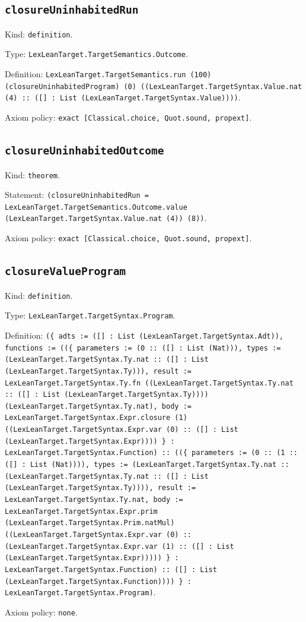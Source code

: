 \documentclass[11pt]{article}
\begin{document}
\subsection*{\texttt{closureUninhabitedRun}}
\noindent Kind: \texttt{definition}.\par
\noindent Type: \texttt{LexLeanTarget.TargetSemantics.Outcome}.\par
\noindent Definition: \texttt{LexLeanTarget.TargetSemantics.run (100) (closureUninhabitedProgram) (0) ((LexLeanTarget.TargetSyntax.Value.nat (4) :: ([] : List (LexLeanTarget.TargetSyntax.Value))))}.\par
\noindent Axiom policy: \texttt{exact [Classical.choice, Quot.sound, propext]}.\par
\subsection*{\texttt{closureUninhabitedOutcome}}
\noindent Kind: \texttt{theorem}.\par
\noindent Statement: \texttt{(closureUninhabitedRun = LexLeanTarget.TargetSemantics.Outcome.value (LexLeanTarget.TargetSyntax.Value.nat (4)) (8))}.\par
\noindent Axiom policy: \texttt{exact [Classical.choice, Quot.sound, propext]}.\par
\subsection*{\texttt{closureValueProgram}}
\noindent Kind: \texttt{definition}.\par
\noindent Type: \texttt{LexLeanTarget.TargetSyntax.Program}.\par
\noindent Definition: \texttt{(\{ adts := ([] : List (LexLeanTarget.TargetSyntax.Adt)), functions := ((\{ parameters := (0 :: ([] : List (Nat))), types := (LexLeanTarget.TargetSyntax.Ty.nat :: ([] : List (LexLeanTarget.TargetSyntax.Ty))), result := LexLeanTarget.TargetSyntax.Ty.fn ((LexLeanTarget.TargetSyntax.Ty.nat :: ([] : List (LexLeanTarget.TargetSyntax.Ty)))) (LexLeanTarget.TargetSyntax.Ty.nat), body := LexLeanTarget.TargetSyntax.Expr.closure (1) ((LexLeanTarget.TargetSyntax.Expr.var (0) :: ([] : List (LexLeanTarget.TargetSyntax.Expr)))) \} : LexLeanTarget.TargetSyntax.Function) :: ((\{ parameters := (0 :: (1 :: ([] : List (Nat)))), types := (LexLeanTarget.TargetSyntax.Ty.nat :: (LexLeanTarget.TargetSyntax.Ty.nat :: ([] : List (LexLeanTarget.TargetSyntax.Ty)))), result := LexLeanTarget.TargetSyntax.Ty.nat, body := LexLeanTarget.TargetSyntax.Expr.prim (LexLeanTarget.TargetSyntax.Prim.natMul) ((LexLeanTarget.TargetSyntax.Expr.var (0) :: (LexLeanTarget.TargetSyntax.Expr.var (1) :: ([] : List (LexLeanTarget.TargetSyntax.Expr))))) \} : LexLeanTarget.TargetSyntax.Function) :: ([] : List (LexLeanTarget.TargetSyntax.Function)))) \} : LexLeanTarget.TargetSyntax.Program)}.\par
\noindent Axiom policy: \texttt{none}.\par
\end{document}

